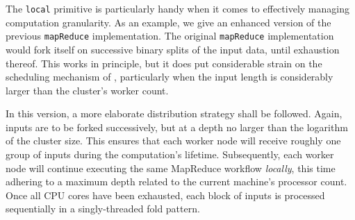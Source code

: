 The \texttt{local} primitive is particularly handy when it comes to effectively managing 
computation granularity. As an example, we give an enhanced version of the previous 
\texttt{mapReduce} implementation. The original \texttt{mapReduce} implementation would 
fork itself on successive binary splits of the input data, until exhaustion thereof.
This works in principle, but it does put considerable strain on the scheduling mechanism of
\mbrace, particularly when the input length is considerably larger than the cluster's
worker count.

In this version, a more elaborate distribution strategy shall be followed.
Again, inputs are to be forked successively, but at a depth no larger than the logarithm
of the cluster size. This ensures that each worker node will receive roughly one group
of inputs during the computation's lifetime. Subsequently, each worker node will continue
executing the same MapReduce workflow \emph{locally}, this time adhering to a maximum 
depth related to the current machine's processor count. Once all CPU cores have been
exhausted, each block of inputs is processed sequentially in a singly-threaded fold pattern.
